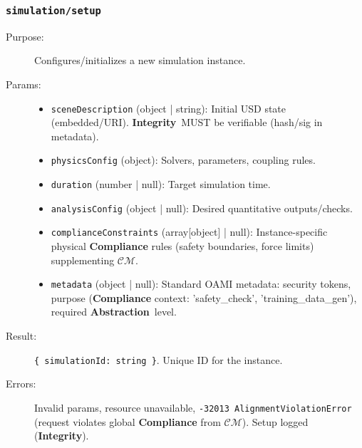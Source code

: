 \documentclass[12pt,a4paper]{report}
\newcommand{\Integrity}{\textbf{Integrity}}
\newcommand{\Abstraction}{\textbf{Abstraction}}
\begin{document}
	\subsubsection{\texttt{simulation/setup}}
	\label{app:oasim_sim_setup}
	\begin{description}
		\item[Purpose:] Configures/initializes a new simulation instance.
		\item[Params:]
		\begin{itemize} \itemsep0em
			\item \texttt{sceneDescription} (object | string): Initial USD state (embedded/URI). \Integrity\ MUST be verifiable (hash/sig in metadata).
			\item \texttt{physicsConfig} (object): Solvers, parameters, coupling rules.
			\item \texttt{duration} (number | null): Target simulation time.
			\item \texttt{analysisConfig} (object | null): Desired quantitative outputs/checks.
			\item \texttt{complianceConstraints} (array[object] | null): Instance-specific physical \textbf{Compliance} rules (safety boundaries, force limits) supplementing $\mathcal{CM}$.
			\item \texttt{metadata} (object | null): Standard OAMI metadata: security tokens, purpose (\textbf{Compliance} context: 'safety\_check', 'training\_data\_gen'), required \Abstraction\ level.
		\end{itemize}
		\item[Result:] \texttt{\{ simulationId: string \}}. Unique ID for the instance.
		\item[Errors:] Invalid params, resource unavailable, \texttt{-32013 AlignmentViolationError} (request violates global \textbf{Compliance} from $\mathcal{CM}$). Setup logged (\Integrity).
	\end{description}
	
\end{document}
